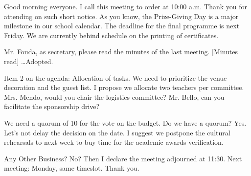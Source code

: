\documentclass[11pt]{article}
\newcommand{\cle}[1]{{\popxbold\color{popdark}#1}}
\begin{document}
\begin{textebox}
Good morning everyone. I \cle{call this meeting to order} at 10:00 a.m. Thank you for \cle{attending} on such short notice. As you know, the Prize-Giving Day is a major \cle{milestone} in our school calendar. The \cle{deadline} for the final programme is next Friday. We are currently \cle{behind schedule} on the printing of certificates.

Mr. Fouda, as \cle{secretary}, please read the \cle{minutes} of the last meeting.
[Minutes read] \dots \cle{Adopted}.

Item 2 on the \cle{agenda}: \cle{Allocation} of tasks. We need to \cle{prioritize} the venue decoration and the guest list. I propose we \cle{allocate} two teachers per committee. Mrs. Mendo, would you \cle{chair} the logistics committee? Mr. Bello, can you \cle{facilitate} the sponsorship drive?

We need a \cle{quorum} of 10 for the vote on the budget. Do we have a quorum? Yes.
Let's not \cle{delay} the decision on the date. I suggest we \cle{postpone} the cultural rehearsals to next week to \cle{buy time} for the academic awards verification.

Any \cle{Other Business}? No? Then I declare the meeting \cle{adjourned} at 11:30. Next meeting: Monday, same \cle{timeslot}. Thank you.
\end{textebox}
\end{document}
